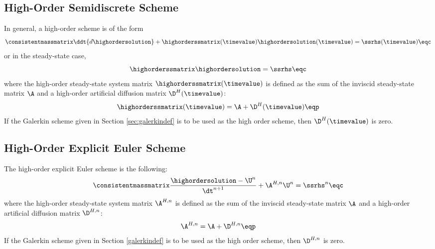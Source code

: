 \subsection{High-Order Semidiscrete Scheme}
In general, a high-order scheme is of the form
\begin{equation}\label{eq:high_semidiscrete}
   \consistentmassmatrix\ddt{d\highordersolution}
    + \highorderssmatrix(\timevalue)\highordersolution(\timevalue) 
    = \ssrhs(\timevalue) \eqc
\end{equation}
or in the steady-state case,
\begin{equation}\label{eq:high_ss}
   \highorderssmatrix\highordersolution = \ssrhs \eqc
\end{equation}
where the high-order steady-state system matrix $\highorderssmatrix(\timevalue)$ is
defined as the sum of the inviscid steady-state matrix $\A$
and a high-order artificial diffusion matrix $\D^H(\timevalue)$:
\begin{equation}
   \highorderssmatrix(\timevalue) = \A + \D^H(\timevalue) \eqp
\end{equation}
If the Galerkin scheme given in Section \ref{sec:galerkindef} is to be
used as the high order scheme, then $\D^H(\timevalue)$ is zero.
\subsection{High-Order Explicit Euler Scheme}
The high-order explicit Euler scheme is the following:
\begin{equation}\label{high_FE}
   \consistentmassmatrix\frac{\highordersolution-\U^n}{\dt^{n+1}} + \A^{H,n}\U^n = \ssrhs^n \eqc
\end{equation}
where the high-order steady-state system matrix $\A^{H,n}$ is
defined as the sum of the inviscid steady-state matrix $\A$
and a high-order artificial diffusion matrix $\D^{H,n}$:
\begin{equation}
   \A^{H,n} = \A + \D^{H,n} \eqp
\end{equation}
If the Galerkin scheme given in Section \ref{galerkindef} is to be
used as the high order scheme, then $\D^{H,n}$ is zero.
